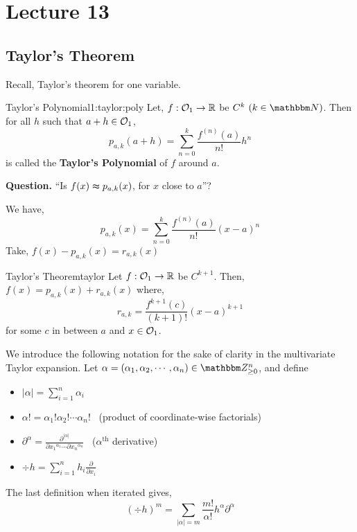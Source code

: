 \documentclass[../Analysis-3.tex]{subfiles}
\begin{document}
\chapter*{Lecture 13} %
\setcounter{chapter}{13} %
\setcounter{section}{0}
\setcounter{equation}{0}
\setcounter{figure}{0}


\section{Taylor's Theorem}
Recall, Taylor's theorem for one variable.
\begin{Def}{Taylor's Polynomial}{1:taylor:poly}
  Let, $ f : \mathcal{O}_{1} \to \mathbb{R} $ be $C^k \ (k \in \N)$. Then for all $h$ such that $a+h \in \mathcal{O}_{1}$,
  \[ p_{a,k}(a+h) = \sum_{n = 0}^{k} \frac{f^{(n)}(a)}{n!} h^{n}\]
  is called the \textbf{Taylor's Polynomial} of $f$ around $a$.
\end{Def}

\textbf{Question.} ``Is $f(x) \thickapprox  p_{a,k}(x)$, for $x$ close to $a$''?

We have,
\[  p_{a,k}(x) = \sum_{n = 0}^{k} \frac{f^{(n)}(a)}{n!} (x-a)^{n} \]
Take, $f(x) - p_{a,k}(x) = r_{a,k}(x)$

\begin{Thm}{Taylor's Theorem}{taylor}
  Let $ f: \mathcal{O}_{1} \to \mathbb{R} $ be $C^{k+1}$. Then, $f(x) = p_{a,k}(x) + r_{a,k}(x)$ where,
  \[r_{a,k} = \frac{f^{k+1}(c)}{(k+1)!} (x-a)^{k+1}\]
  for some $c$ in between $a$ and $x \in \mathcal{O}_{1}$.
\end{Thm}

We introduce the following notation for the sake of clarity in the multivariate Taylor expansion. Let \( \alpha = (\alpha_1 , \alpha_2 , \cdots , \alpha_n) \in \Z_{\geq 0}^{n} \), and define
\begin{itemize}
  \item $|\alpha| = \sum_{i = 1}^{n} \alpha_i$
  \item $\alpha ! = \alpha_1 ! \alpha_2 ! \cdots \alpha_n !$ \, (product of coordinate-wise factorials)
  \item \( \displaystyle\partial^{\alpha} = \frac{\partial^{|\alpha|}}{\partial {x_1}^{\alpha_1} \cdots \partial {x_n}^{\alpha_n}} \) \, (\( \alpha^{\text{th}} \) derivative)
  \item $\displaystyle\div h = \sum_{i=1}^n h_i\frac{\partial}{\partial x_i}$
\end{itemize}
The last definition when iterated gives,
\[\displaystyle(\div h)^m = \sum_{| \alpha | = m } \frac{m!}{\alpha!} h^{\alpha} \partial^{\alpha}\]
\end{document}
